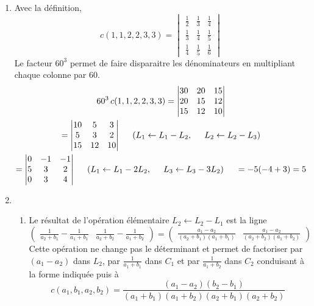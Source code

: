 \begin{enumerate}
  \item Avec la définition,
\renewcommand{\arraystretch}{1.3}
\begin{displaymath}
c(1,1,2,2,3,3) =
\begin{vmatrix}
\frac{1}{2} & \frac{1}{3} & \frac{1}{4} \\ 
\frac{1}{3} & \frac{1}{4} & \frac{1}{5} \\
\frac{1}{4} & \frac{1}{5} & \frac{1}{6} 
\end{vmatrix}
\end{displaymath}
Le facteur $60^3$ permet de faire disparaitre les dénominateurs en multipliant chaque colonne par $60$. 
\begin{multline*}
60^3\, c(1,1,2,2,3,3) =
\begin{vmatrix}
30 & 20 & 15 \\ 
20 & 15 & 12 \\
15 & 12 & 10 
\end{vmatrix}\\
=
\begin{vmatrix}
10 & 5 & 3 \\ 
5 & 3 & 2 \\
15 & 12 & 10 
\end{vmatrix} \hspace{0.5cm}
\left( L_1\leftarrow L_1-L_2,\hspace{0.5cm} L_2\leftarrow L_2 - L_3\right) \\
=
\begin{vmatrix}
0 & -1 & -1 \\ 
5 & 3 & 2 \\
0 & 3 & 4 
\end{vmatrix}\hspace{0.5cm}
\left( L_1\leftarrow L_1-2L_2,\hspace{0.5cm} L_3\leftarrow L_3 - 3L_2\right)\hspace{0.5cm}
=-5(-4+3) = 5
\end{multline*}

  \item
\begin{enumerate}
  \item Le résultat de l'opération élémentaire $L_2 \leftarrow L_2 -L_1$ est la ligne
\begin{displaymath}
\begin{pmatrix}
\frac{1}{a_2+b_1}-\frac{1}{a_1+b_1} &  \frac{1}{a_2+b_2}-\frac{1}{a_1+b_2} 
\end{pmatrix}  
=
\begin{pmatrix}
  \frac{a_1-a_2}{(a_2+b_1)(a_1+b_1)} & \frac{a_1-a_2}{(a_2+b_2)(a_1+b_2)}
\end{pmatrix}
\end{displaymath}
Cette opération ne change pas le déterminant et permet de factoriser par $(a_1-a_2)$ dans $L_2$, par $\frac{1}{a_1+b_1}$ dans $C_1$ et par $\frac{1}{a_1+b_2}$ dans $C_2$ conduisant à la forme indiquée puis à
\begin{displaymath}
  c(a_1,b_1,a_2,b_2)=
\frac{(a_1-a_2)(b_2-b_1)}{(a_1+b_1)(a_1+b_2)(a_2+b_1)(a_2+b_2)}
\end{displaymath}


\end{enumerate}
\end{enumerate}
